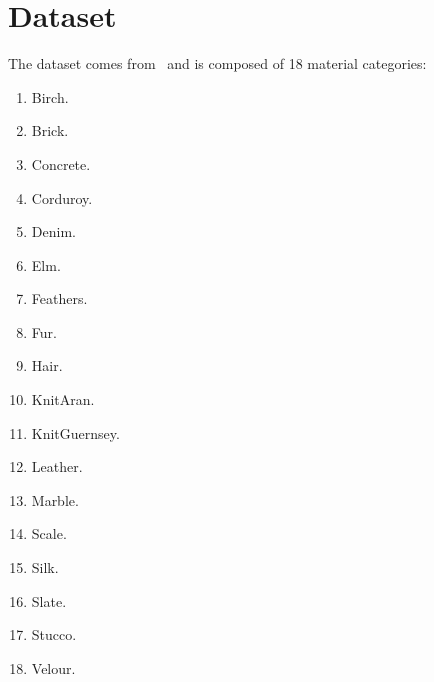 
\section{Dataset}

The dataset comes from~\cite{Liao_2013_CVPR} and is composed of 18 material categories: \\

\begin{minipage}{0.33\textwidth}
    \begin{enumerate}   
        \setlength{\itemsep}{0.5pt}
        \item Birch.
        \item Brick.
        \item Concrete.
        \item Corduroy.
        \item Denim.
        \item Elm.
    \end{enumerate} 
\end{minipage}
\begin{minipage}{0.33\textwidth}
    \begin{enumerate}   
        \setcounter{enumi}{6}
        \setlength{\itemsep}{0.5pt}
        \item Feathers.
        \item Fur.
        \item Hair.
        \item KnitAran.
        \item KnitGuernsey.
        \item Leather.
    \end{enumerate} 
\end{minipage}
\begin{minipage}{0.33\textwidth}
    \begin{enumerate}   
        \setcounter{enumi}{12}
        \setlength{\itemsep}{0.5pt}
        \item Marble.
        \item Scale.
        \item Silk.
        \item Slate.
        \item Stucco.
        \item Velour.
    \end{enumerate} 
\end{minipage} \\\\

